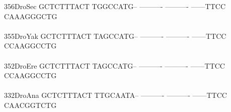\documentclass[11pt,twoside,reqno,a4paper]{article}
\begin{document}
{356\hspace*{1\charwidth}DroSec	GCTCTTTACT	TGGCCATG--	----------	----------	------TTCC	CAAAGGGCTG	\\
\hspace*{4\charwidth}\hspace*{7\charwidth}\hspace*{1\charwidth}\hspace*{1\charwidth}\hspace*{1\charwidth}\hspace*{1\charwidth}\hspace*{1\charwidth}\hspace*{1\charwidth}\\
355\hspace*{1\charwidth}DroYak	GCTCTTTACT	TAGCCATG--	----------	----------	------TTCC	CCAAGGCCTG	\\
\hspace*{4\charwidth}\hspace*{7\charwidth}\hspace*{1\charwidth}\hspace*{1\charwidth}\hspace*{1\charwidth}\hspace*{1\charwidth}\hspace*{1\charwidth}\hspace*{1\charwidth}\\
352\hspace*{1\charwidth}DroEre	GCTCTTTACT	TAGCCATG--	----------	----------	------TTCC	CCAAGGCCTG	\\
\hspace*{4\charwidth}\hspace*{7\charwidth}\hspace*{1\charwidth}\hspace*{1\charwidth}\hspace*{1\charwidth}\hspace*{1\charwidth}\hspace*{1\charwidth}\hspace*{1\charwidth}\\
332\hspace*{1\charwidth}DroAna	GCTCTTTACT	TTGCAATA--	----------	----------	------TTCC	CAACGGTCTG	\\
\hspace*{4\charwidth}\hspace*{7\charwidth}\hspace*{1\charwidth}\hspace*{1\charwidth}\hspace*{1\charwidth}\hspace*{1\charwidth}\hspace*{1\charwidth}\hspace*{1\charwidth}\\
}
\end{document}
